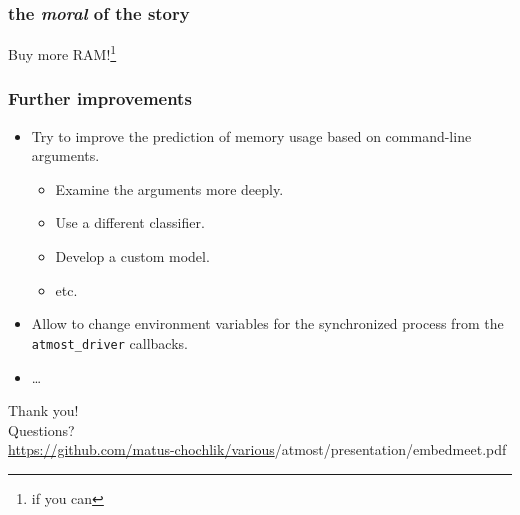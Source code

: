 \documentclass[compress,table,xcolor=table]{beamer}
\newcommand{\shelltext}[1]{\texttt{\colorbox{light-gray}{#1}}}
\begin{document}
\begin{frame}
  \frametitle{the {\em \LARGE moral} of the story}
  \centering
  \Huge
	Buy more RAM!\footnote{if you can}
\end{frame}
\begin{frame}
  \frametitle{Further improvements}
  \begin{itemize}
    \Large
    \item Try to improve the prediction of memory usage based on command-line
      arguments.
    \begin{itemize}
      \item Examine the arguments more deeply.
      \item Use a different classifier.
      \item Develop a custom model.
      \item etc.
    \end{itemize}
    \item Allow to change environment variables for the synchronized process
      from the \shelltext{atmost\_driver} callbacks.
    \item \ldots
  \end{itemize}
\end{frame}
\begin{frame}
  \centering
  \Huge
  Thank you!\\Questions?\\
  \vfill
  \Large
  \url{https://github.com/matus-chochlik/various}/atmost/presentation/embedmeet.pdf
\end{frame}
\end{document}
